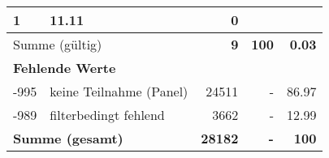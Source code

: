 \begin{longtable}{lXrrr}
       \num{1} &
       \num[round-mode=places,round-precision=2]{11,11} &
         \num[round-mode=places,round-precision=2]{0} \\
     \midrule
     \multicolumn{2}{l}{Summe (gültig)} &
       \textbf{\num{9}} &
     \textbf{100} &
       \textbf{\num[round-mode=places,round-precision=2]{0,03}} \\
     \multicolumn{5}{l}{\textbf{Fehlende Werte}}\\
       -995 &
       keine Teilnahme (Panel) &
         \num{24511} &
        - &
         \num[round-mode=places,round-precision=2]{86,97} \\
       -989 &
       filterbedingt fehlend &
         \num{3662} &
        - &
         \num[round-mode=places,round-precision=2]{12,99} \\
     \midrule
     \multicolumn{2}{l}{\textbf{Summe (gesamt)}} &
          \textbf{\num{28182}} &
        \textbf{-} &
        \textbf{100} \\
     \bottomrule
     \end{longtable}
     
